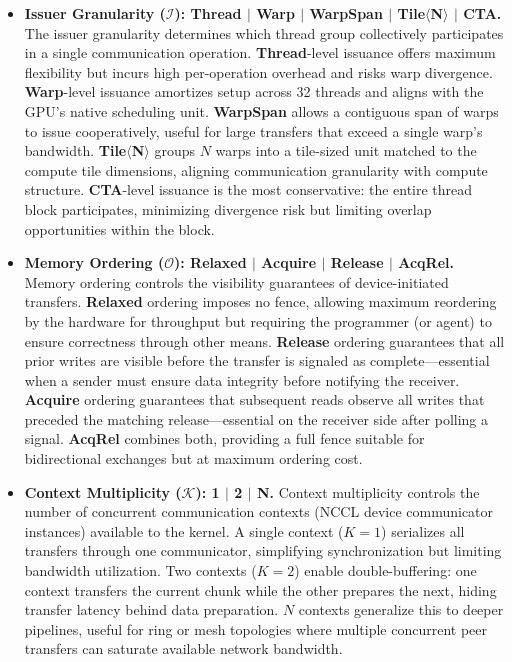 \begin{itemize}[leftmargin=1.4em,itemsep=2pt,topsep=2pt]
\item \textbf{Issuer Granularity ($\mathcal{I}$): Thread $|$ Warp $|$ WarpSpan $|$ Tile$\langle$N$\rangle$ $|$ CTA.}
The issuer granularity determines which thread group collectively participates in a single communication operation. \textbf{Thread}-level issuance offers maximum flexibility but incurs high per-operation overhead and risks warp divergence. \textbf{Warp}-level issuance amortizes setup across 32 threads and aligns with the GPU's native scheduling unit. \textbf{WarpSpan} allows a contiguous span of warps to issue cooperatively, useful for large transfers that exceed a single warp's bandwidth. \textbf{Tile$\langle$N$\rangle$} groups $N$ warps into a tile-sized unit matched to the compute tile dimensions, aligning communication granularity with compute structure. \textbf{CTA}-level issuance is the most conservative: the entire thread block participates, minimizing divergence risk but limiting overlap opportunities within the block.

\item \textbf{Memory Ordering ($\mathcal{O}$): Relaxed $|$ Acquire $|$ Release $|$ AcqRel.}
Memory ordering controls the visibility guarantees of device-initiated transfers. \textbf{Relaxed} ordering imposes no fence, allowing maximum reordering by the hardware for throughput but requiring the programmer (or agent) to ensure correctness through other means. \textbf{Release} ordering guarantees that all prior writes are visible before the transfer is signaled as complete---essential when a sender must ensure data integrity before notifying the receiver. \textbf{Acquire} ordering guarantees that subsequent reads observe all writes that preceded the matching release---essential on the receiver side after polling a signal. \textbf{AcqRel} combines both, providing a full fence suitable for bidirectional exchanges but at maximum ordering cost.

\item \textbf{Context Multiplicity ($\mathcal{K}$): 1 $|$ 2 $|$ N.}
Context multiplicity controls the number of concurrent communication contexts (NCCL device communicator instances) available to the kernel. A single context ($K{=}1$) serializes all transfers through one communicator, simplifying synchronization but limiting bandwidth utilization. Two contexts ($K{=}2$) enable double-buffering: one context transfers the current chunk while the other prepares the next, hiding transfer latency behind data preparation. $N$ contexts generalize this to deeper pipelines, useful for ring or mesh topologies where multiple concurrent peer transfers can saturate available network bandwidth.

\end{itemize}

